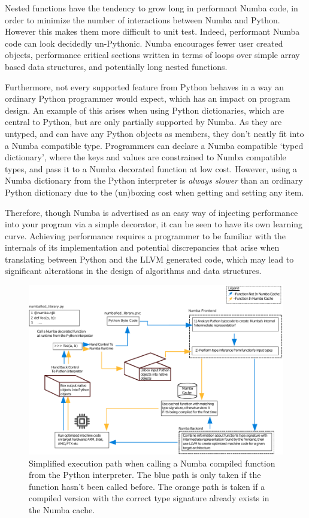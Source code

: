 \documentclass{IEEEcsmag}
\begin{document}
Nested functions have the tendency to grow long in performant Numba code, in order to minimize the number of interactions between Numba and Python. However this makes them more difficult to unit test. Indeed, performant Numba code can look decidedly un-Pythonic. Numba encourages fewer user created objects, performance critical sections written in terms of loops over simple array based data structures, and potentially long nested functions. 

Furthermore, not every supported feature from Python behaves in a way an ordinary Python programmer would expect, which has an impact on program design. An example of this arises when using Python dictionaries, which are central to Python, but are only partially supported by Numba. As they are untyped, and can have any Python objects as members, they don't neatly fit into a Numba compatible type. Programmers can declare a Numba compatible `typed dictionary', where the keys and values are constrained to Numba compatible types, and pass it to a Numba decorated function at low cost. However, using a Numba dictionary from the Python interpreter is \textit{always slower} than an ordinary Python dictionary due to the (un)boxing cost when getting and setting any item.

Therefore, though Numba is advertised as an easy way of injecting performance into your program via a simple decorator, it can be seen to have its own learning curve. Achieving performance requires a programmer to be familiar with the internals of its implementation and potential discrepancies that arise when translating between Python and the LLVM generated code, which may lead to significant alterations in the design of algorithms and data structures.

\begin{figure}
    \centerline{\includegraphics {figures/numba.pdf}}
    \caption{Simplified execution path when calling a Numba compiled function from the Python interpreter. The blue path is only taken if the function hasn't been called before. The orange path is taken if a compiled version with the correct type signature already exists in the Numba cache.}
    \label{fig:numba}
\end{figure}
\end{document}
